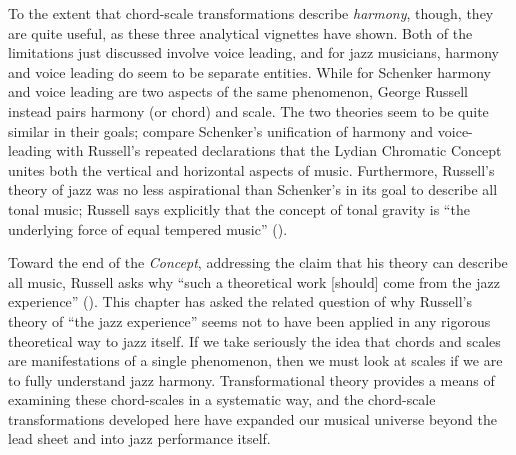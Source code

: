 To the extent that chord-scale transformations describe \emph{harmony},
though, they are quite useful, as these three analytical vignettes have shown.
Both of the limitations just discussed involve voice leading, and for jazz
musicians, harmony and voice leading do seem to be separate
entities. While for Schenker harmony and voice leading are two
aspects of the same phenomenon, George Russell instead pairs harmony (or chord)
and scale. The two theories seem to be quite similar in their goals; compare
Schenker's unification of harmony and voice-leading with Russell's repeated
declarations that the Lydian Chromatic Concept unites both the
vertical and horizontal aspects of music. Furthermore, Russell's theory of
jazz was no less aspirational than Schenker's in its goal to describe all
tonal music; Russell says explicitly that the concept of tonal
gravity is ``the underlying force of equal tempered music'' ().

Toward the end of the \emph{Concept}, addressing the claim that his theory can
describe all music, Russell asks why ``such a theoretical work [should] come from
the jazz experience'' (). This chapter has asked the related question
of why Russell's theory of ``the jazz experience'' seems not to have been
applied in any rigorous theoretical way to jazz itself. If we take seriously
the idea that chords and scales are manifestations of a single phenomenon,
then we must look at scales if we are to fully understand jazz harmony.
Transformational theory provides a means of examining these chord-scales in a
systematic way, and the chord-scale transformations developed here have
expanded our musical universe beyond the lead sheet and into jazz performance
itself.


